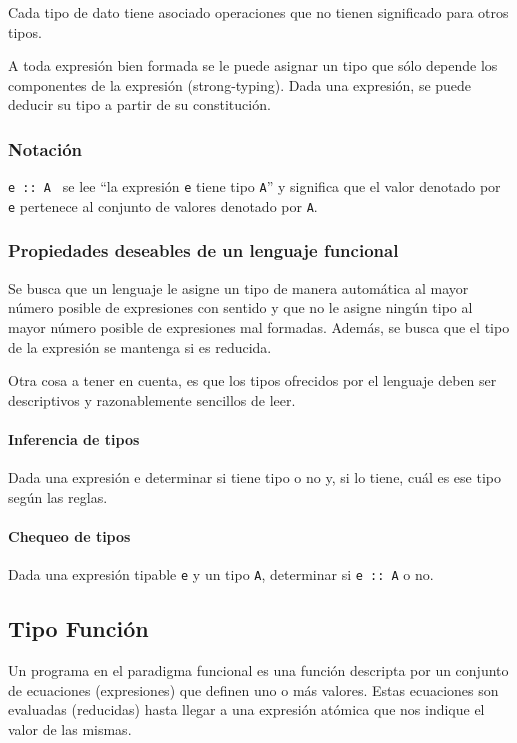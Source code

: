 Cada tipo de dato tiene asociado operaciones que no tienen significado para otros tipos.

A toda expresión bien formada se le puede asignar un tipo que sólo depende los componentes de la expresión (strong-typing). Dada una expresión, se puede deducir su tipo a partir de su constitución.

\subsubsection{Notación}  
\texttt{e :: A } se lee “la expresión \texttt{e} tiene tipo \texttt{A}” y significa que el valor denotado por \texttt{e} pertenece al conjunto de valores denotado por \texttt{A}.

\subsubsection{Propiedades deseables de un lenguaje funcional}
Se busca que un lenguaje le asigne un tipo de manera automática al mayor número posible de expresiones con sentido y que no le asigne ningún tipo al mayor número posible de expresiones mal formadas. Además, se busca que el tipo de la expresión se mantenga si es reducida.

Otra cosa a tener en cuenta, es que los tipos ofrecidos por el lenguaje deben ser descriptivos y razonablemente sencillos de leer.

\paragraph{Inferencia de tipos} Dada una expresión e determinar si tiene tipo o no y, si lo tiene, cuál es ese tipo según las reglas.

\paragraph{Chequeo de tipos} Dada una expresión tipable \texttt{e} y un tipo \texttt{A}, determinar si \texttt{e :: A} o no.

\subsection{Tipo Función}
Un programa en el paradigma funcional es una función descripta por un conjunto de ecuaciones (expresiones) que definen uno o más valores. Estas ecuaciones son evaluadas (reducidas) hasta llegar a una expresión atómica que nos indique el valor de las mismas.

